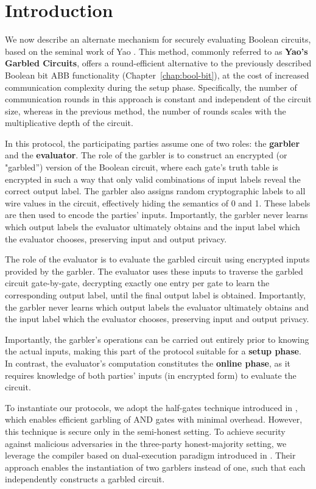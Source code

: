 \section{Introduction}

We now describe an alternate mechanism for securely evaluating Boolean circuits, based on the seminal work of Yao \cite{FOCS:Yao82b}.
This method, commonly referred to as \textbf{Yao's Garbled Circuits}, offers a round-efficient alternative to the previously described
Boolean bit ABB functionality (Chapter~\ref{chap:bool-bit}), at the cost of increased communication complexity during the setup phase.
Specifically, the number of communication rounds in this approach is constant and independent of the circuit size, whereas in the
previous method, the number of rounds scales with the multiplicative depth of the circuit.

In this protocol, the participating parties assume one of two roles: the \textbf{garbler} and the \textbf{evaluator}. The role of the
garbler is to construct an encrypted (or "garbled'') version of the Boolean circuit, where each gate’s truth table is encrypted in such
a way that only valid combinations of input labels reveal the correct output label. The garbler also assigns random cryptographic labels
to all wire values in the circuit, effectively hiding the semantics of 0 and 1. These labels are then used to encode the parties' inputs.
Importantly, the garbler never learns which output labels the evaluator ultimately obtains and the input label which the evaluator
chooses, preserving input and output privacy.

The role of the evaluator is to evaluate the garbled circuit using encrypted inputs provided by the garbler. The evaluator uses these
inputs to traverse the garbled circuit gate-by-gate, decrypting exactly one entry per gate to learn the corresponding output label,
until the final output label is obtained. Importantly, the garbler never learns which output labels the evaluator ultimately obtains and 
the input label which the evaluator chooses, preserving input and output privacy.

Importantly, the garbler's operations can be carried out entirely prior to knowing the actual inputs, making this part of the protocol
suitable for a \textbf{setup phase}. In contrast, the evaluator’s computation constitutes the \textbf{online phase}, as it requires
knowledge of both parties’ inputs (in encrypted form) to evaluate the circuit.

To instantiate our protocols, we adopt the half-gates technique introduced in \cite{EC:ZahRosEva15}, which enables efficient garbling of
AND gates with minimal overhead. However, this technique is secure only in the semi-honest setting. To achieve security against
malicious adversaries in the three-party honest-majority setting, we leverage the compiler based on dual-execution paradigm introduced
in \cite{CCS:MohRosZha15}. Their approach enables the instantiation of two garblers instead of one, such that each independently
constructs a garbled circuit.

